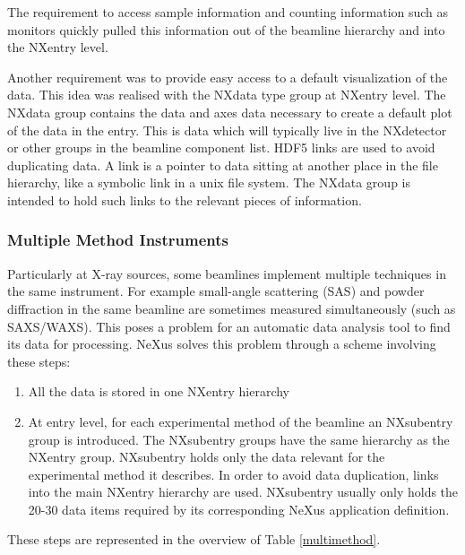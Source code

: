 \documentclass[%
 aip,
rsi,
 amsmath,amssymb,
 reprint,%
]{revtex4-1}
\begin{document}
The requirement to access sample information and counting information such as monitors quickly 
pulled this information out of the beamline hierarchy and into the NXentry level.

Another requirement was to provide easy access to a default visualization of the data. This idea was realised with the 
NXdata type group at NXentry level. The NXdata group contains the data and axes data necessary to create a default plot of 
the data in the entry. This is data which will typically live in the NXdetector or other groups in the 
beamline component list. HDF5 links are used to avoid duplicating data. A link 
is a pointer to data sitting at another place in the file hierarchy, like a symbolic link in a unix 
file system.  The NXdata group is intended to hold such links to the relevant pieces of information.

\subsubsection{Multiple Method Instruments}

Particularly at X-ray sources, some beamlines implement multiple techniques in the same instrument. 
For example small-angle scattering (SAS) and powder diffraction in the same beamline are sometimes measured 
simultaneously (such as SAXS/WAXS). This poses a problem for an automatic data analysis tool to find its data 
for processing.  NeXus solves this problem through a scheme involving these steps:
\begin{enumerate}
\item All the data is stored in one NXentry hierarchy
\item At entry level, for each experimental method of the beamline an NXsubentry group is introduced. The 
  NXsubentry groups have the same hierarchy as the  NXentry group. NXsubentry holds only the data relevant 
  for the experimental method it describes. In order to avoid data duplication, links into the main NXentry 
  hierarchy are used. 
  NXsubentry usually only holds the 20-30 data items required by its corresponding NeXus 
  application definition.  
\end{enumerate} 
These steps are represented in the overview of Table \ref{multimethod}.
\end{document}
